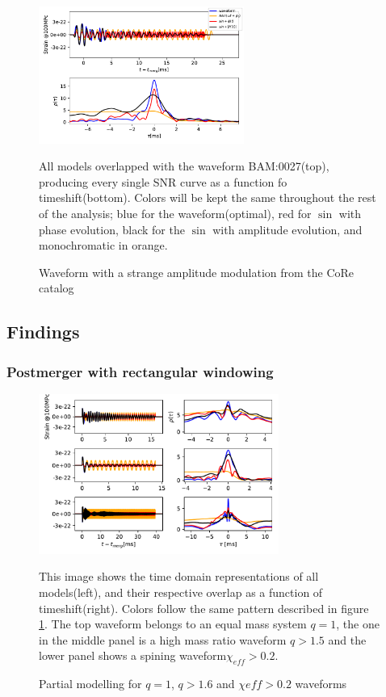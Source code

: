 \begin{figure}[hbt!]
\begin{center}
\includegraphics[width=0.6\textwidth, angle=0]{images/Data_analysis/results/phi-A0.pdf}
\caption{Waveform with a strange amplitude modulation from the CoRe catalog}
\label{analysis}
\end{center}
All models overlapped with the waveform BAM:0027(top), producing every single SNR curve as a function fo timeshift(bottom). Colors will be kept the same throughout the rest of the analysis; blue for the waveform(optimal), red for $\sin$ with phase evolution, black for the $\sin$ with amplitude evolution, and monochromatic in orange.
\end{figure}
\FloatBarrier

\subsection*{Findings}

\subsubsection*{Postmerger with rectangular windowing}

\begin{figure}[hbt!]
\begin{center}
\includegraphics[width=0.7\textwidth, angle=0]{images/Data_analysis/results/phi-A1.pdf}
\caption{Partial modelling for $q=1$, $q>1.6$ and $\chi{eff}>0.2$ waveforms}
\end{center}
This image shows the time domain representations of all models(left), and their respective overlap as a function of timeshift(right). Colors follow the same pattern described in figure \ref{analysis}. The top waveform belongs to an equal mass system $q=1$, the one in the middle panel is a high mass ratio waveform $q>1.5$ and the lower panel shows a spining waveform$\chi_{eff}>0.2$.
\end{figure}

